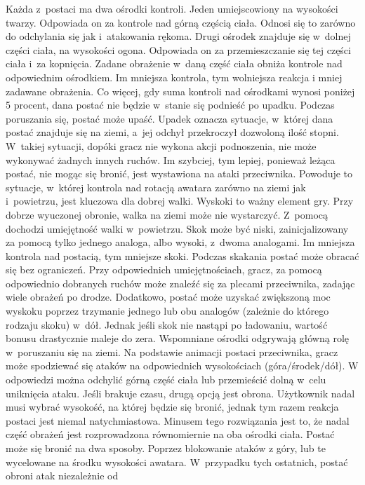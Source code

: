 \documentclass[brudnopis]{xmgr}
\begin{document}
Każda z~postaci ma dwa ośrodki kontroli. Jeden umiejscowiony na wysokości
twarzy. Odpowiada on za kontrole nad górną
częścią ciała. Odnosi się to zarówno do odchylania się jak i~atakowania
rękoma. Drugi ośrodek znajduje się w~dolnej części ciała, na wysokości
ogona. Odpowiada on za przemieszczanie się tej części ciała i~za
kopnięcia. Zadane obrażenie w~daną część ciała obniża kontrole nad
odpowiednim ośrodkiem. Im mniejsza kontrola, tym wolniejsza reakcja i
mniej zadawane obrażenia. Co więcej, gdy suma kontroli nad ośrodkami
wynosi poniżej 5 procent, dana postać nie będzie w~stanie się podnieść po
upadku. Podczas poruszania się, postać może upaść. Upadek oznacza
sytuacje, w~której dana postać znajduje
się na ziemi, a~jej odchył przekroczył dozwoloną ilość stopni. W~takiej
sytuacji, dopóki gracz nie wykona akcji podnoszenia, nie może wykonywać
żadnych innych ruchów. Im szybciej, tym lepiej,
ponieważ leżąca postać, nie mogąc się bronić, jest wystawiona na ataki
przeciwnika. Powoduje to sytuacje, w~której kontrola nad rotacją awatara zarówno na ziemi jak i~powietrzu, jest kluczowa dla dobrej walki. Wyskoki to ważny element gry. Przy dobrze
wyuczonej obronie, walka na ziemi może nie wystarczyć. Z~pomocą dochodzi umiejętność walki w~powietrzu. Skok może być niski,
zainicjalizowany za pomocą tylko jednego
analoga, albo wysoki, z~dwoma analogami. Im mniejsza kontrola nad
postacią, tym mniejsze skoki. Podczas skakania postać może obracać się bez
ograniczeń. Przy odpowiednich umiejętnościach, gracz,
za pomocą odpowiednio dobranych ruchów może znaleźć się za plecami przeciwnika, zadając wiele obrażeń po drodze. Dodatkowo, postać może
uzyskać zwiększoną moc wyskoku poprzez trzymanie jednego lub
obu analogów (zależnie do którego rodzaju skoku) w~dół. Jednak jeśli skok
nie nastąpi po ładowaniu, wartość bonusu drastycznie maleje do zera.
Wspomniane ośrodki odgrywają główną rolę w~poruszaniu się na ziemi. Na
podstawie animacji postaci przeciwnika, gracz może spodziewać się ataków
na odpowiednich wysokościach (góra/środek/dół). W
odpowiedzi można odchylić górną część ciała lub przemieścić dolną w~celu
uniknięcia ataku. Jeśli brakuje czasu, drugą opcją jest obrona. Użytkownik
nadal musi wybrać wysokość, na której będzie się bronić, jednak
tym razem reakcja postaci jest niemal natychmiastowa. Minusem tego
rozwiązania jest to, że nadal część obrażeń jest rozprowadzona równomiernie na oba ośrodki ciała.
Postać może się bronić na dwa sposoby. Poprzez blokowanie ataków z góry, lub te wycelowane na środku wysokości awatara. W~przypadku tych ostatnich, postać obroni atak niezależnie od
\end{document}
